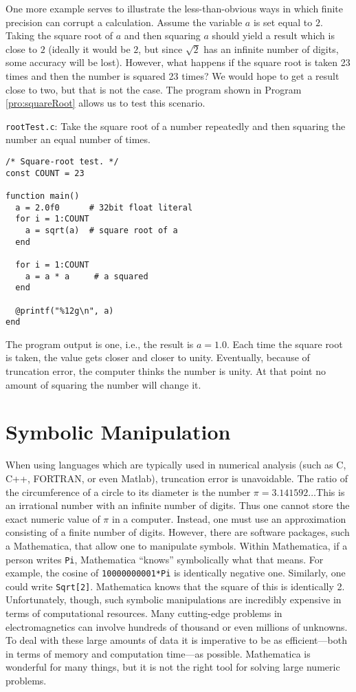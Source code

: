 One more example serves to illustrate the less-than-obvious ways in
which finite precision can corrupt a calculation.  Assume the variable
$a$ is set equal to $2$.  Taking the square root of $a$ and then
squaring $a$ should yield a result which is close to $2$ (ideally it
would be $2$, but since $\sqrt{2}$ has an infinite number of digits,
some accuracy will be lost).  However, what happens if the square root
is taken 23 times and then the number is squared 23 times?  We would
hope to get a result close to two, but that is not the case.
The program shown in Program \ref{pro:squareRoot} allows us to test
this scenario.
\begin{program}
{\tt rootTest.c}: 
Take the square root of a number repeatedly
and then squaring the number an equal number of
times. \label{pro:squareRoot}
\codemiddle
\begin{lstlisting}
/* Square-root test. */
const COUNT = 23

function main()
  a = 2.0f0      # 32bit float literal
  for i = 1:COUNT
    a = sqrt(a)  # square root of a
  end

  for i = 1:COUNT
    a = a * a     # a squared
  end

  @printf("%12g\n", a)
end
\end{lstlisting}
\end{program}
The program output is one, i.e., the result is $a=1.0$.  Each time the
square root is taken, the value gets closer and closer to unity.
Eventually, because of truncation error, the computer thinks the
number is unity.  At that point no amount of squaring the number will
change it.

\section{Symbolic Manipulation}

When using languages which are typically used in numerical analysis
(such as C, C++, FORTRAN, or even Matlab), truncation error is
unavoidable.  The ratio of the circumference of a circle to its
diameter is the number $\pi=3.141592\ldots$\@ This is an irrational
number with an infinite number of digits.  Thus one cannot store the
exact numeric value of $\pi$ in a computer.  Instead, one must use an
approximation consisting of a finite number of digits.  However, there
are software packages, such a Mathematica, that allow one to
manipulate symbols.  Within Mathematica, if a person writes {\tt Pi},
Mathematica ``knows'' symbolically what that means.  For example, the
cosine of {\tt 10000000001*Pi} is identically negative one.
Similarly, one could write {\tt Sqrt[2]}.  Mathematica knows that the
square of this is identically 2.  Unfortunately, though, such symbolic
manipulations are incredibly expensive in terms of computational
resources.  Many cutting-edge problems in electromagnetics can involve
hundreds of thousand or even millions of unknowns.  To deal with these
large amounts of data it is imperative to be as efficient---both in
terms of memory and computation time---as possible.  Mathematica is
wonderful for many things, but it is not the right tool for solving
large numeric problems.

